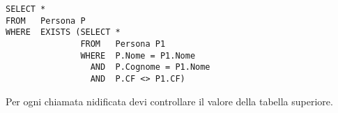 \begin{lstlisting}
SELECT *
FROM   Persona P
WHERE  EXISTS (SELECT *
               FROM   Persona P1
			   WHERE  P.Nome = P1.Nome
			     AND  P.Cognome = P1.Nome
				 AND  P.CF <> P1.CF)
\end{lstlisting}

Per ogni chiamata nidificata devi controllare il valore della tabella superiore.

